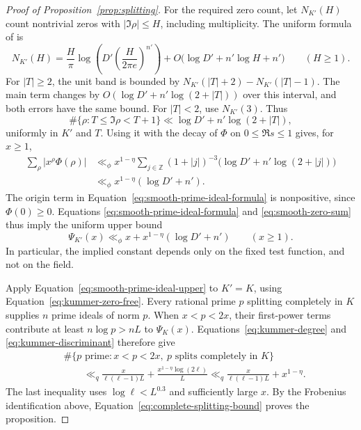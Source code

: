\begin{proof}[Proof of Proposition~\ref{prop:splitting}]
For the required zero count, let \(N_{K'}(H)\) count nontrivial zeros with
\(|\Im\rho|\le H\), including multiplicity.  The uniform formula of
\cite[Corollary~1.2, Equation~(1.3)]{HasanalizadeShenWong2022} is
\[
 N_{K'}(H)=\frac H\pi
   \log\left(D'\left(\frac{H}{2\pi e}\right)^{n'}\right)
   +O\bigl(\log D'+n'\log H+n'\bigr)\qquad(H\ge1).
\]
For \(|T|\ge2\), the unit band is bounded by
\(N_{K'}(|T|+2)-N_{K'}(|T|-1)\).  The main term changes by
\(O(\log D'+n'\log(2+|T|))\) over this interval, and both errors have the
same bound.  For \(|T|<2\), use \(N_{K'}(3)\).  Thus
\begin{equation}
 \#\{\rho:T\le\Im\rho<T+1\}
 \ll \log D'+n'\log(2+|T|),
 \label{eq:unit-height-zero-count}
\end{equation}
uniformly in \(K'\) and \(T\).  Using it with the decay of \(\Phi\) on
\(0\le\Re s\le1\) gives, for \(x\ge1\),
\begin{equation}
 \begin{aligned}
 \sum_\rho|x^\rho\Phi(\rho)|
 &\ll_\phi x^{1-\eta}\sum_{j\in\mathbb Z}(1+|j|)^{-3}
       \bigl(\log D'+n'\log(2+|j|)\bigr)\\
 &\ll_\phi x^{1-\eta}(\log D'+n').
 \end{aligned}
 \label{eq:smooth-zero-sum}
\end{equation}
The origin term in Equation~\eqref{eq:smooth-prime-ideal-formula} is
nonpositive, since \(\Phi(0)\ge0\).  Equations
\eqref{eq:smooth-prime-ideal-formula} and \eqref{eq:smooth-zero-sum} thus
imply the uniform upper bound
\begin{equation}
 \Psi_{K'}(x)\ll_\phi x+x^{1-\eta}(\log D'+n')\qquad(x\ge1).
 \label{eq:smooth-prime-ideal-upper}
\end{equation}
In particular, the implied constant depends only on the fixed test function,
and not on the field.

Apply Equation~\eqref{eq:smooth-prime-ideal-upper} to \(K'=K\), using
Equation~\eqref{eq:kummer-zero-free}.  Every rational prime \(p\) splitting
completely in \(K\) supplies \(n\) prime ideals of norm \(p\).  When
\(x<p<2x\), their first-power terms contribute at least \(n\log p>nL\)
to \(\Psi_K(x)\).  Equations~\eqref{eq:kummer-degree} and
\eqref{eq:kummer-discriminant} therefore give
\begin{equation}
 \begin{aligned}
 &\#\{p\text{ prime}:x<p<2x,\ p\text{ splits completely in }K\}\\
 &\qquad\ll_q \frac{x}{\ell(\ell-1)L}
       +\frac{x^{1-\eta}\log(2\ell)}{L}
 \ll_q \frac{x}{\ell(\ell-1)L}+x^{1-\eta}.
 \end{aligned}
 \label{eq:complete-splitting-bound}
\end{equation}
The last inequality uses \(\log\ell<L^{0.3}\) and sufficiently large \(x\).
By the Frobenius identification above,
Equation~\eqref{eq:complete-splitting-bound} proves the proposition.
\end{proof}
